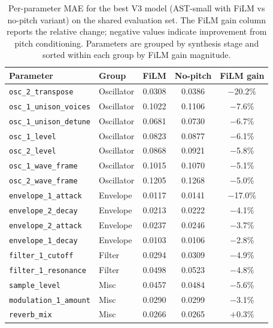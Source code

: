 \begin{table}[H]
\centering
\renewcommand{\arraystretch}{1.3}
\begin{tabular}{llccc}
\hline
\textbf{Parameter} & \textbf{Group} & \textbf{FiLM} & \textbf{No-pitch} & \textbf{FiLM gain} \\
\hline
\texttt{osc\_2\_transpose}       & Oscillator & 0.0308 & 0.0386 & $-$20.2\% \\
\texttt{osc\_1\_unison\_voices}  & Oscillator & 0.1022 & 0.1106 & $-$7.6\% \\
\texttt{osc\_1\_unison\_detune}  & Oscillator & 0.0681 & 0.0730 & $-$6.7\% \\
\texttt{osc\_1\_level}           & Oscillator & 0.0823 & 0.0877 & $-$6.1\% \\
\texttt{osc\_2\_level}           & Oscillator & 0.0868 & 0.0921 & $-$5.8\% \\
\texttt{osc\_1\_wave\_frame}     & Oscillator & 0.1015 & 0.1070 & $-$5.1\% \\
\texttt{osc\_2\_wave\_frame}     & Oscillator & 0.1205 & 0.1268 & $-$5.0\% \\
\hline
\texttt{envelope\_1\_attack}     & Envelope   & 0.0117 & 0.0141 & $-$17.0\% \\
\texttt{envelope\_2\_decay}      & Envelope   & 0.0213 & 0.0222 & $-$4.1\% \\
\texttt{envelope\_2\_attack}     & Envelope   & 0.0237 & 0.0246 & $-$3.7\% \\
\texttt{envelope\_1\_decay}      & Envelope   & 0.0103 & 0.0106 & $-$2.8\% \\
\hline
\texttt{filter\_1\_cutoff}       & Filter     & 0.0294 & 0.0309 & $-$4.9\% \\
\texttt{filter\_1\_resonance}    & Filter     & 0.0498 & 0.0523 & $-$4.8\% \\
\hline
\texttt{sample\_level}           & Misc       & 0.0457 & 0.0484 & $-$5.6\% \\
\texttt{modulation\_1\_amount}   & Misc       & 0.0290 & 0.0299 & $-$3.1\% \\
\texttt{reverb\_mix}             & Misc       & 0.0266 & 0.0265 & $+$0.3\% \\
\hline
\end{tabular}
\vspace{0.3cm}
\caption{Per-parameter MAE for the best V3 model (AST-small with FiLM vs no-pitch variant) on the shared evaluation set. The FiLM gain column reports the relative change; negative values indicate improvement from pitch conditioning. Parameters are grouped by synthesis stage and sorted within each group by FiLM gain magnitude.}
\label{tab:per_param_film}
\end{table}

